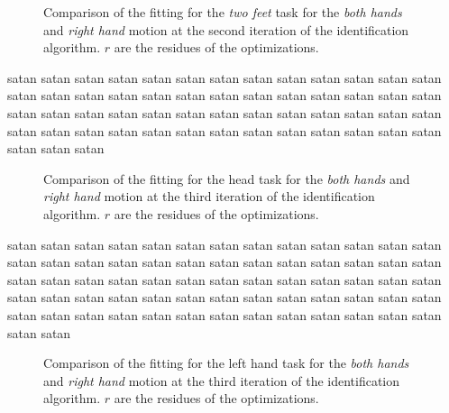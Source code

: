 \documentclass[letterpaper, 10pt, conference]{ieeeconf}      %
\begin{document}
\begin{figure}[t]
  \centering
\caption{Comparison of the fitting for the \emph{two feet} task for the \emph{both hands} and \emph{right hand} motion at the second iteration of the identification algorithm. $r$ are the residues of the optimizations.}
\label{fig:exp1:taskTwofeet1}
\end{figure}

satan satan satan satan satan satan satan satan satan satan satan
satan satan satan satan satan satan satan satan satan satan satan
satan satan satan satan satan satan satan satan satan satan satan
satan satan satan satan satan satan satan satan satan satan satan
satan satan satan satan satan satan satan satan satan satan satan

\begin{figure}[t]
  \centering
\caption{Comparison of the fitting for the head task for the \emph{both hands} and \emph{right hand} motion at the third iteration of the identification algorithm.
$r$ are the residues of the optimizations.}
\label{fig:exp1:taskHead2}
\end{figure}

satan satan satan satan satan satan satan satan satan satan satan
satan satan satan satan satan satan satan satan satan satan satan
satan satan satan satan satan satan satan satan satan satan satan
satan satan satan satan satan satan satan satan satan satan satan
satan satan satan satan satan satan satan satan satan satan satan
satan satan satan satan satan satan satan satan satan satan satan
satan

\begin{figure}[t]
  \centering
\caption{Comparison of the fitting for the left hand task for the \emph{both hands} and \emph{right hand} motion at the third iteration of the identification algorithm.
$r$ are the residues of the optimizations.}
\label{fig:exp1:taskLhand2}
\end{figure}
\end{document}
